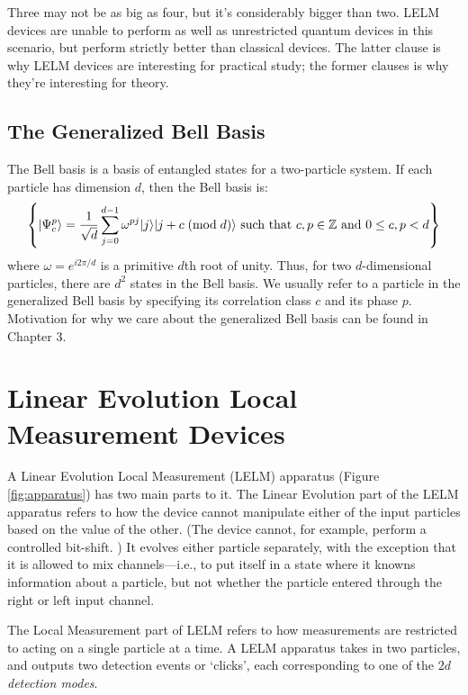 Three may not be as big as four, but it's considerably bigger than two. LELM devices are unable to perform as well as unrestricted quantum devices in this scenario, but perform strictly better than classical devices. The latter clause is why LELM devices are interesting for practical study; the former clauses is why they're interesting for theory. 

\subsection{The Generalized Bell Basis}

The Bell basis is a basis of entangled states for a two-particle system. If each particle has dimension $d$, then the Bell basis is:
\[
\left\{ | \Psi_c^p \rangle = \frac{1}{\sqrt{d}} \sum_{j=0}^{d-1} \omega^{pj} | j \rangle| j + c \;(\text{mod}\; d) \rangle \text{ such that } c, p \in \mathbb{Z} \text{ and } 0 \leq c,p < d \right\}
\]
where $\omega = e^{i 2 \pi / d}$ is a primitive $d$th root of unity. Thus, for two $d$-dimensional particles, there are $d^2$ states in the Bell basis. We usually refer to a particle in the generalized Bell basis by specifying its correlation class $c$ and its phase $p$. Motivation for why we care about the generalized Bell basis can be found in Chapter 3.

\section{Linear Evolution Local Measurement Devices}

A Linear Evolution Local Measurement (LELM) apparatus (Figure \ref{fig:apparatus}) has two main parts to it. The Linear Evolution part of the LELM apparatus refers to how the device cannot manipulate either of the input particles based on the value of the other. (The device cannot, for example, perform a controlled bit-shift. ) It evolves either particle separately, with the exception that it is allowed to mix channels---i.e., to put itself in a state where it knowns information about a particle, but not whether the particle entered through the right or left input channel.

The Local Measurement part of LELM refers to how measurements are restricted to acting on a single particle at a time. A LELM apparatus takes in two particles, and outputs two detection events or `clicks', each corresponding to one of the $2d$ \textit{detection modes}.

